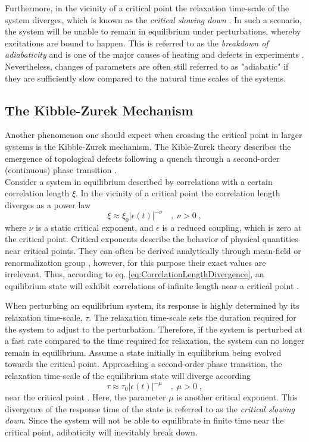 Furthermore, in the vicinity of a critical point the relaxation time-scale of the system diverges, which is known as the \textit{critical slowing down} \cite{Zurek2005}. In such a scenario, the system will be unable to remain in equilibrium under perturbations, whereby excitations are bound to happen. This is referred to as the \textit{breakdown of adiabaticity} and is one of the major causes of heating and defects in experiments \cite{Zakrzewski2009}. Nevertheless, changes of parameters are often still referred to as "adiabatic" if they are sufficiently slow compared to the natural time scales of the systems.


\subsection{The Kibble-Zurek Mechanism}
Another phenomenon one should expect when crossing the critical point in larger systems is the Kibble-Zurek mechanism. The Kible-Zurek theory describes the emergence of topological defects following a quench through a second-order (continuous) phase transition \cite{Zurek2005}.\\

Consider a system in equilibrium described by correlations with a certain correlation length $\xi$. In the vicinity of a critical point the correlation length diverges as a power law
\begin{equation}
	\xi  \approx \xi_0 |\epsilon (t)|^{-\nu} \quad , \; \nu > 0 \; ,
	\label{eq:CorrelationLengthDivergence}
\end{equation} 
where $\nu$ is a static critical exponent, and $\epsilon$ is a reduced coupling, which is zero at the critical point. Critical exponents describe the behavior of physical quantities near critical points. They can often be derived analytically through mean-field or renormalization group \cite{Stanley1971}, however, for this purpose their exact values are irrelevant. 
Thus, according to eq. \eqref{eq:CorrelationLengthDivergence}, an equilibrium state will exhibit correlations of infinite length near a critical point \cite{Kibble1976}.

When perturbing an equilibrium system, its response is highly determined by its relaxation time-scale, $\tau$. The relaxation time-scale sets the duration required for the system to adjust to the perturbation. Therefore, if the system is perturbed at a fast rate compared to the time required for relaxation, the system can no longer remain in equilibrium.
Assume a state initially in equilibrium being evolved towards the critical point. Approaching a second-order phase transition, the relaxation time-scale of the equilibrium state will diverge according
\begin{equation}
	\tau \approx \tau_0 |\epsilon (t)|^{-\mu} \quad , \; \mu > 0 \; ,
\end{equation}
near the critical point \cite{Zurek2005}. Here, the parameter $\mu$ is another critical exponent. This divergence of the response time of the state is referred to as the \textit{critical slowing down}. Since the system will not be able to equilibrate in finite time near the critical point, adibaticity will inevitably break down. 

